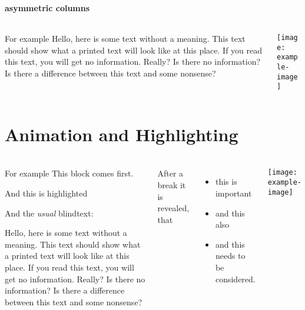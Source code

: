 \documentclass[10pt,compress,
               xcolor={dvipsnames,table},
               hyperref={breaklinks}
              ]{beamer}
\begin{document}
\begin{frame}
\frametitle{\insertsection}
\framesubtitle{asymmetric columns}
\begin{columns}
  \begin{column}{0.59\textwidth}
    \begin{block}{For example}
      Hello, here is some text without a
      meaning. This text should show
      what a printed text will look like at
      this place. If you read this text,
      you will get no information.
      Really? Is there no information? Is
      there a difference between this text
      and some nonsense?
    \end{block}
  \end{column}\hfill
  \begin{column}{0.39\textwidth}
    \texttt{[image: example-image]}%
  \end{column}
\end{columns}
\end{frame}

\section{Animation and Highlighting}
\begin{frame}[t]
\frametitle{\insertsection}
\begin{columns}[T]
  \begin{block}{For example}
      This block comes first.

      \alert<1>{And this is highlighted}

      And the \emph{usual} blindtext:

      Hello, here is some text without a
      meaning. This text should show
      what a printed text will look like at
      this place. If you read this text,
      you will get no information.
      Really? Is there no information? Is
      there a difference between this text
      and some nonsense?
    \end{block}
    \pause
    After a break it is revealed, that 
    \begin{itemize}[<+- | alert@+>]
      \item this is important
      \item and this also
      \item and this needs to be considered.
    \end{itemize}
    \vspace{2ex}
    \pause
    \texttt{[image: example-image]}
\end{columns}
\end{frame}
\end{document}
